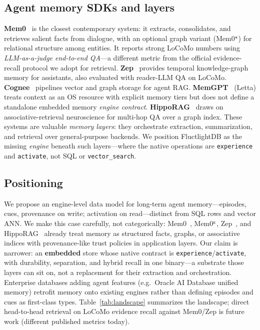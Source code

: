 \documentclass[11pt]{article}
\begin{document}
\subsection{Agent memory SDKs and layers}
\textbf{Mem0}~\cite{chhikara2025mem0} is the closest contemporary system: it
extracts, consolidates, and retrieves salient facts from dialogue, with an optional
graph variant (Mem0$^{\text{\tiny g}}$) for relational structure among entities. It
reports strong LoCoMo numbers using \emph{LLM-as-a-judge end-to-end QA}---a
different metric from the official evidence-recall protocol we adopt for retrieval.
\textbf{Zep}~\cite{zep2024} provides temporal knowledge-graph memory for
assistants, also evaluated with reader-LLM QA on LoCoMo. \textbf{Cognee}~\cite{cognee2024}
pipelines vector and graph storage for agent RAG. \textbf{MemGPT}~\cite{packer2023memgpt}
(Letta) treats context as an OS resource with explicit memory tiers but does not
define a standalone embedded memory \emph{engine contract}. \textbf{HippoRAG}~\cite{gutierrez2024hipporag}
draws on associative-retrieval neuroscience for multi-hop QA over a graph index.
These systems are valuable \emph{memory layers}: they orchestrate extraction,
summarization, and retrieval over general-purpose backends. We position
FluctlightDB as the missing \emph{engine} beneath such layers---where the native
operations are \texttt{experience} and \texttt{activate}, not SQL or
\texttt{vector\_search}.

\subsection{Positioning}
We propose an engine-level data model for long-term agent memory---episodes, cues,
provenance on write; activation on read---distinct from SQL rows and vector ANN.
We make this case carefully, not categorically: Mem0~\cite{chhikara2025mem0},
Mem0$^{\text{\tiny g}}$, Zep~\cite{zep2024}, and HippoRAG~\cite{gutierrez2024hipporag}
already treat memory as structured facts, graphs, or associative indices with
provenance-like trust policies in application layers. Our claim is narrower: an
\textbf{embedded} store whose native contract is \texttt{experience}/\texttt{activate},
with durability, separation, and hybrid recall in one binary---a substrate those
layers can sit on, not a replacement for their extraction and orchestration.
Enterprise databases adding agent features (e.g.\ Oracle AI Database unified memory)
retrofit memory onto existing engines rather than defining episodes and cues as
first-class types. Table~\ref{tab:landscape} summarizes the landscape; direct
head-to-head retrieval on LoCoMo evidence recall against Mem0/Zep is future work
(different published metrics today).
\end{document}
